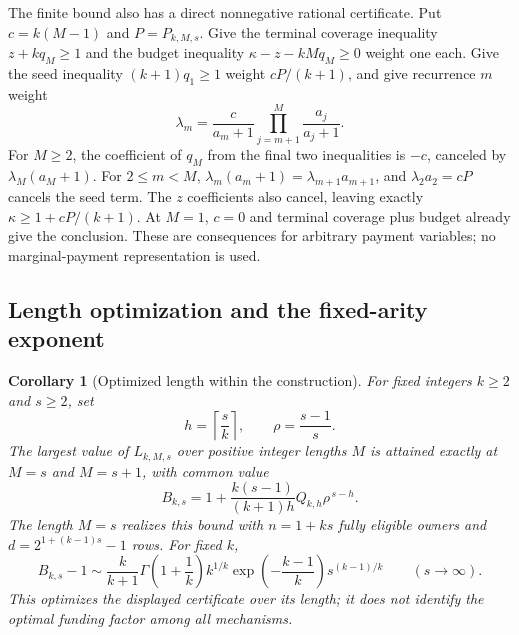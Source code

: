 \documentclass[11pt]{article}
\newtheorem{corollary}[theorem]{Corollary}
\theoremstyle{definition}\newtheorem{definition}[theorem]{Definition}
\theoremstyle{remark}\newtheorem{remark}[theorem]{Remark}
\begin{document}
The finite bound also has a direct nonnegative rational certificate.
Put $c=k(M-1)$ and $P=P_{k,M,s}$.  Give the terminal coverage inequality
$z+kq_M\geq1$ and the budget inequality
$\kappa-z-kMq_M\geq0$ weight one each.  Give the seed inequality
$(k+1)q_1\geq1$ weight $cP/(k+1)$, and give recurrence $m$ weight
\begin{equation}
  \lambda_m=\frac{c}{a_m+1}
    \prod_{j=m+1}^{M}\frac{a_j}{a_j+1}.
  \label{arity:certificate-weights}
\end{equation}
For $M\geq2$, the coefficient of $q_M$ from the final two inequalities is
$-c$, canceled by $\lambda_M(a_M+1)$.  For $2\leq m<M$,
$\lambda_m(a_m+1)=\lambda_{m+1}a_{m+1}$, and
$\lambda_2a_2=cP$ cancels the seed term.  The $z$ coefficients also cancel,
leaving exactly $\kappa\geq1+cP/(k+1)$.  At $M=1$, $c=0$ and terminal
coverage plus budget already give the conclusion.  These are consequences
for arbitrary payment variables; no marginal-payment representation is used.

\subsection{Length optimization and the fixed-arity exponent}
\label{arity:rate-section}

\begin{corollary}[Optimized length within the construction]
\label{arity:optimized}
For fixed integers $k\geq2$ and $s\geq2$, set
\[
  h=\left\lceil\frac{s}{k}\right\rceil,
  \qquad \rho=\frac{s-1}{s}.
\]
The largest value of $L_{k,M,s}$ over positive integer lengths $M$ is
attained exactly at $M=s$ and $M=s+1$, with common value
\begin{equation}
  B_{k,s}
  =1+\frac{k(s-1)}{(k+1)h}Q_{k,h}\rho^{\,s-h}.
  \label{arity:optimized-bound}
\end{equation}
The length $M=s$ realizes this bound with
$n=1+ks$ fully eligible owners and $d=2^{1+(k-1)s}-1$ rows.  For fixed $k$,
\begin{equation}
  B_{k,s}-1\sim
  \frac{k}{k+1}\Gamma\!\left(1+\frac1k\right)
       k^{1/k}\exp\!\left(-\frac{k-1}{k}\right)
       s^{(k-1)/k}
       \qquad(s\longrightarrow\infty).
  \label{arity:asymptotic}
\end{equation}
This optimizes the displayed certificate over its length; it does not
identify the optimal funding factor among all mechanisms.
\end{corollary}
\end{document}
